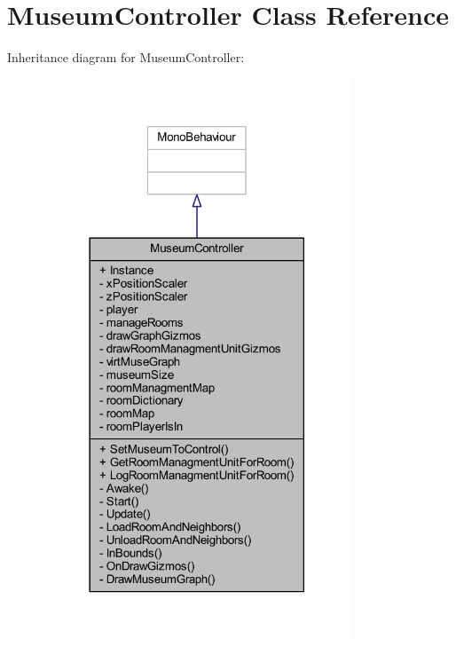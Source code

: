 \hypertarget{class_museum_controller}{}\section{Museum\+Controller Class Reference}
\label{class_museum_controller}


Inheritance diagram for Museum\+Controller\+:\nopagebreak
\begin{figure}[H]
\begin{center}
\leavevmode
\includegraphics[width=261pt]{class_museum_controller__inherit__graph}
\end{center}
\end{figure}


